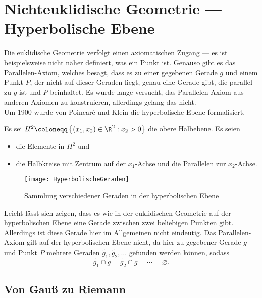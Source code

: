 \chapter{Nichteuklidische Geometrie --- Hyperbolische Ebene}

Die euklidische Geometrie verfolgt einen axiomatischen Zugang --- es ist beispielsweise nicht näher definiert, was ein Punkt ist. Genauso gibt es das Parallelen-Axiom, welches besagt, dass es zu einer gegebenen Gerade \( g \) und einem Punkt \( P \), der nicht auf dieser Geraden liegt, genau eine Gerade gibt, die parallel zu \( g \) ist und \( P \) beinhaltet. Es wurde lange versucht, das Parallelen-Axiom aus anderen Axiomen zu konstruieren, allerdings gelang das nicht. \\
Um 1900 wurde von Poincaré und Klein die hyperbolische Ebene formalisiert.

\begin{definition}
  Es sei \( H^2 \coloneqq \left \{ \left( x_1, x_2 \right) \in \R^2 : x_2 > 0 \right \} \) die obere Halbebene. Es seien
  \begin{itemize}
    \item {} die Elemente in \( H^2 \) und
    \item {} die Halbkreise mit Zentrum auf der \( x_1 \)-Achse und die Parallelen zur \( x_2 \)-Achse.
  \end{itemize}

  \begin{figure}[H]
    \texttt{[image: HyperbolischeGeraden]}
    \caption{Sammlung verschiedener Geraden in der hyperbolischen Ebene}
  \end{figure}

  Leicht lässt sich zeigen, dass es wie in der euklidischen Geometrie auf der hyperbolischen Ebene eine Gerade zwischen zwei beliebigen Punkten gibt. Allerdings ist diese Gerade hier im Allgemeinen nicht eindeutig. Das Parallelen-Axiom gilt auf der hyperbolischen Ebene nicht, da hier zu gegebener Gerade \( g \) und Punkt \( P \) mehrere Geraden \( \widetilde{g_1}, \widetilde{g_2}, \dots \) gefunden werden können, sodass
  \begin{equation*}
    \widetilde{g_1} \cap g = \widetilde{g_2} \cap g = \cdots = \varnothing\text{.}
  \end{equation*}
\end{definition}

\section{Von Gauß zu Riemann}

